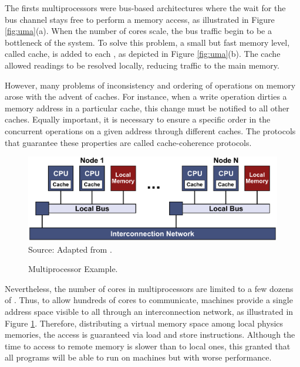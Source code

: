 			The firsts \uma multiprocessors were bus-based architectures where
			the \cpu wait for the bus channel stays free to perform a memory
			access, as illustrated in Figure \ref{fig:uma}(a).
			When the number of cores scale, the bus traffic begin to be a
			bottleneck of the system.
			To solve this problem, a small but fast memory level, called cache,
			is added to each \cpu, as depicted in Figure \ref{fig:uma}(b).
			The cache allowed readings to be resolved locally, reducing traffic
			to the main memory.

			However, many problems of inconsistency and ordering of operations
			on memory arose with the advent of caches.
			For instance, when a write operation dirties a memory address in
			a particular cache, this change must be notified to all other caches.
			Equally important, it is necessary to ensure a specific order in
			the concurrent operations on a given address through different caches.
			The protocols that guarantee these properties are called cache-coherence protocols.

			\begin{figure}[t]
				\centering
				\caption{\numa Multiprocessor Example.}

				\includegraphics[width=.8\textwidth]{images/numa.pdf} \\ \vspace{0.3cm}
				Source: Adapted from \cite{tanenbaum:4ed}.

				\label{fig.numa}
			\end{figure}

			Nevertheless, the number of cores in \uma multiprocessors are limited
			to a few dozens of \cpus.
			Thus, to allow hundreds of cores to communicate, \numa machines provide
			a single address space visible to all \cpus through an interconnection
			network,  as illustrated in Figure \ref{fig.numa}.
			Therefore, distributing a virtual memory space among local physics memories,
			the access is guaranteed via load and store instructions.
			Although the time to access to remote memory is slower than to local ones,
			this granted that all \uma programs will be able to run on \numa machines
			but with worse performance.

